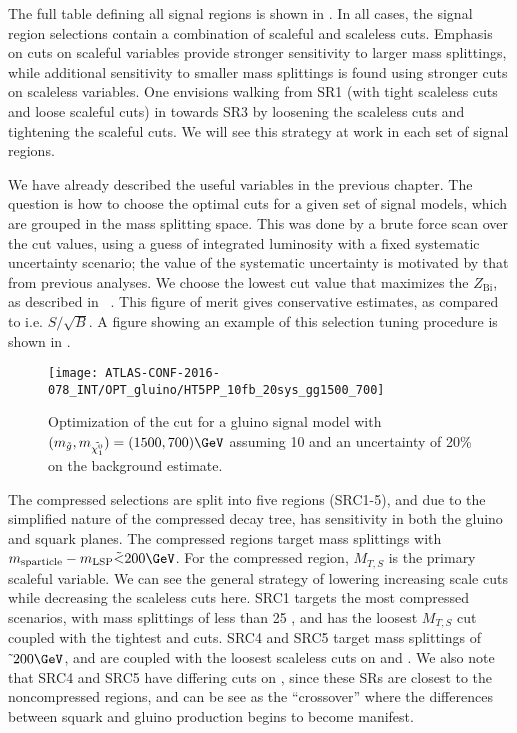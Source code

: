 The full table defining all signal regions is shown in .
In all cases, the signal region selections contain a combination of scaleful and scaleless cuts.
Emphasis on cuts on scaleful variables provide stronger sensitivity to larger mass splittings, while additional sensitivity to smaller mass splittings is found using stronger cuts on scaleless variables.
One envisions walking from SR1 (with tight scaleless cuts and loose scaleful cuts) in  towards SR3 by loosening the scaleless cuts and tightening the scaleful cuts.
We will see this strategy at work in each set of signal regions.

We have already described the useful variables in the previous chapter.
The question is how to choose the optimal cuts for a given set of signal models, which are grouped in the mass splitting space.
This was done by a brute force scan over the cut values, using a guess of integrated luminosity with a fixed systematic uncertainty scenario; the value of the systematic uncertainty is motivated by that from previous analyses.
We choose the lowest cut value that maximizes the $Z_{\text{Bi}}$, as described in ~\cite{Cousins:2008zz}.
This figure of merit gives conservative estimates, as compared to i.e. $S/\sqrt{B}$.
A figure showing an example of this selection tuning procedure is shown in .

\begin{figure}[tbp]
\caption{Optimization of the  cut for a gluino signal model with $(m_{\gluino}, m_{\lsp} ) = (1500,700) \GeV $ assuming 10 \ifb and an uncertainty of 20\% on the background estimate.
} \label{fig:sr_optimization}
\texttt{[image: ATLAS-CONF-2016-078\_INT/OPT\_gluino/HT5PP\_10fb\_20sys\_gg1500\_700]}
\end{figure}

The compressed selections are split into five regions (SRC1-5), and due to the simplified nature of the compressed decay tree, has sensitivity in both the gluino and squark planes.
The compressed regions target mass splittings with $m_{\text{sparticle}} - m_{\text{LSP}} \tilde{<} 200 \GeV$.
For the compressed region, $M_{T, S}$ is the primary scaleful variable.
We can see the general strategy of lowering increasing scale cuts while decreasing the scaleless cuts here.
SRC1 targets the most compressed scenarios, with mass splittings of less than 25 \GeV, and has the loosest $M_{T, S}$ cut coupled with the tightest \risr and \dphiISR cuts.
SRC4 and SRC5 target mass splittings of $\tilde{~} 200 \GeV$, and are coupled with the loosest scaleless cuts on \risr and \dphiISR.
We also note that SRC4 and SRC5 have differing cuts on \NVjet, since these SRs are closest to the noncompressed regions, and can be see as the ``crossover'' where the differences between squark and gluino production begins to become manifest.


